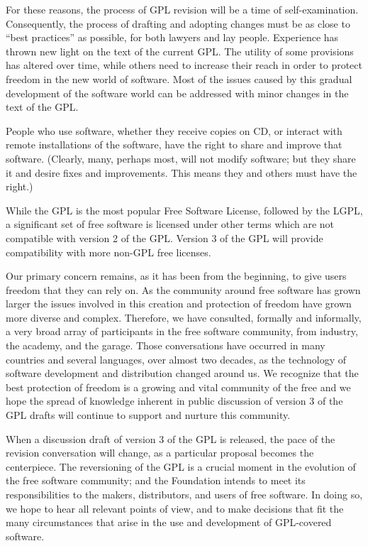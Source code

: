 For these reasons, the process of GPL revision will be a time of
self-examination. Consequently, the process of drafting and adopting changes
must be as close to “best practices” as possible, for both lawyers and lay
people. Experience has thrown new light on the text of the current GPL.
The utility of some provisions has altered over time, while others need
to increase their reach in order to protect freedom in the new world of
software. Most of the issues caused by this gradual development of the
software world can be addressed with minor changes in the text of the
GPL.

People who use software, whether they receive copies on CD, or interact
with remote installations of the software, have the right to share and
improve that software. (Clearly, many, perhaps most, will not modify
software; but they share it and desire fixes and improvements. This means
they and others must have the right.)

While the GPL is the most popular Free Software License, followed by
the LGPL, a significant set of free software is licensed under other terms
which are not compatible with version 2 of the GPL. Version 3 of the GPL
will provide compatibility with more non-GPL free licenses.

Our primary concern remains, as it has been from the beginning, to
give users freedom that they can rely on. As the community around free
software has grown larger the issues involved in this creation and
protection of freedom have grown more diverse and complex. Therefore,
we have consulted, formally and informally, a very broad array of
participants in the free software community, from industry, the academy,
and the garage. Those conversations have occurred in many countries and
several languages, over almost two decades, as the technology of software
development and distribution changed around us. We recognize that the
best protection of freedom is a growing and vital community of the free and
we hope the spread of knowledge inherent in public discussion of version
3 of the GPL drafts will continue to support and nurture this community.

When a discussion draft of version 3 of the GPL is released, the pace
of the revision conversation will change, as a particular proposal becomes
the centerpiece. The reversioning of the GPL is a crucial moment in the
evolution of the free software community; and the Foundation intends to
meet its responsibilities to the makers, distributors, and users of free
software. In doing so, we hope to hear all relevant points of view, and to
make decisions that fit the many circumstances that arise in the use and
development of GPL-covered software.